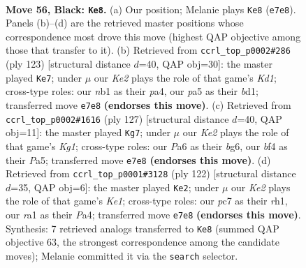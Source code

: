 \documentclass[11pt]{article}
\begin{document}
\clearpage

\begin{figure}[p]\centering
\begin{subfigure}{0.46\textwidth}\centering
\resizebox{\linewidth}{!}{%
\newchessgame
\chessboard[
  setfen={6K1/n1P1k3/p7/P4p1p/4pB2/5bP1/8/RN1r4 b - - 19 56},
  showmover=false,
  pgfstyle=straightmove, color=movearrow, markmove={e7-e8}
]}
\caption{}
\end{subfigure}\hfill
\begin{subfigure}{0.46\textwidth}\centering
\resizebox{\linewidth}{!}{%
\newchessgame
\chessboard[
  setfen={3k4/8/2p4p/r2b3P/P3pP2/4K3/8/R2B4 b - - 2 62},
  showmover=false,
  pgfstyle=straightmove, color=movearrow, markmove={d8-e7}
]}
\caption{}
\end{subfigure}
\\[4pt]
\begin{subfigure}{0.46\textwidth}\centering
\resizebox{\linewidth}{!}{%
\newchessgame
\chessboard[
  setfen={6k1/8/1p4B1/p1p1p3/P1PbP3/5RP1/KP6/7r b - - 14 64},
  showmover=false,
  pgfstyle=straightmove, color=movearrow, markmove={g8-g7}
]}
\caption{}
\end{subfigure}\hfill
\begin{subfigure}{0.46\textwidth}\centering
\resizebox{\linewidth}{!}{%
\newchessgame
\chessboard[
  setfen={8/3k4/1pR5/p2Bp3/P6p/1P3P2/6Pb/4K2r w - - 8 62},
  showmover=false,
  pgfstyle=straightmove, color=movearrow, markmove={e1-e2}
]}
\caption{}
\end{subfigure}
\caption{\textbf{Move 56, Black: \texttt{Ke8}.} (a) Our position; Melanie plays \texttt{Ke8} (\texttt{e7e8}). Panels (b)--(d) are the retrieved master positions whose correspondence most drove this move (highest QAP objective among those that transfer to it). (b) Retrieved from \texttt{ccrl\_top\_p0002\#286} (ply 123) [structural distance $d$=40, QAP obj=30]: the master played \texttt{Ke7}; under $\mu$ our \emph{Ke2} plays the role of that game's \emph{Kd1}; cross-type roles: our \emph{n}b1 as their \emph{p}a4, our \emph{p}a5 as their \emph{b}d1; transferred move \texttt{e7e8} \textbf{(endorses this move)}. (c) Retrieved from \texttt{ccrl\_top\_p0002\#1616} (ply 127) [structural distance $d$=40, QAP obj=11]: the master played \texttt{Kg7}; under $\mu$ our \emph{Ke2} plays the role of that game's \emph{Kg1}; cross-type roles: our \emph{P}a6 as their \emph{b}g6, our \emph{b}f4 as their \emph{P}a5; transferred move \texttt{e7e8} \textbf{(endorses this move)}. (d) Retrieved from \texttt{ccrl\_top\_p0001\#3128} (ply 122) [structural distance $d$=35, QAP obj=6]: the master played \texttt{Ke2}; under $\mu$ our \emph{Ke2} plays the role of that game's \emph{Ke1}; cross-type roles: our \emph{p}c7 as their \emph{r}h1, our \emph{r}a1 as their \emph{P}a4; transferred move \texttt{e7e8} \textbf{(endorses this move)}. Synthesis: 7 retrieved analogs transferred to \texttt{Ke8} (summed QAP objective 63, the strongest correspondence among the candidate moves); Melanie committed it via the \texttt{search} selector.}
\label{fig:thought-m111}
\end{figure}
\end{document}
